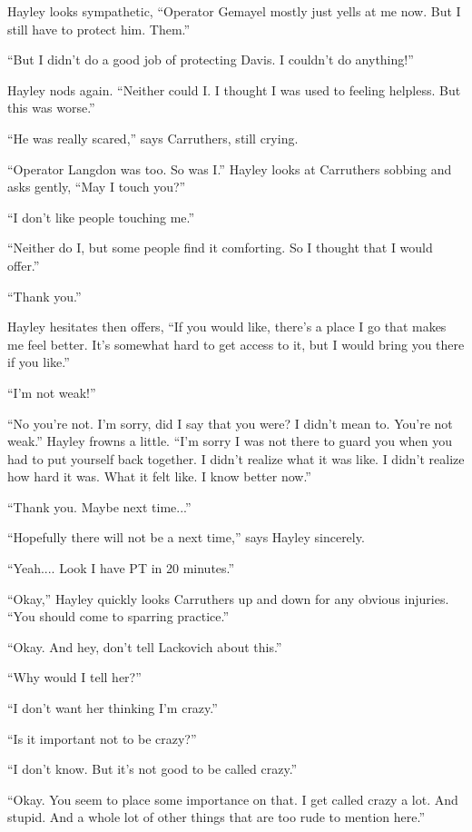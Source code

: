 Hayley looks sympathetic, ``Operator Gemayel mostly just yells at me now.  But I still have to protect him.  Them.''

``But I didn't do a good job of protecting Davis.  I couldn't do anything!''

Hayley nods again.  ``Neither could I.  I thought I was used to feeling helpless.  But this was worse.''

``He was really scared,'' says Carruthers, still crying.

``Operator Langdon was too.  So was I.''  Hayley looks at Carruthers sobbing and asks gently, ``May I touch you?''

``I don't like people touching me.''

``Neither do I, but some people find it comforting.  So I thought that I would offer.''

``Thank you.''

Hayley hesitates then offers, ``If you would like, there's a place I go that makes me feel better.  It's somewhat hard to get access to it, but I would bring you there if you like.''

``I'm not weak!''

``No you're not.  I'm sorry, did I say that you were?  I didn't mean to.  You're not weak.''  Hayley frowns a little.  ``I'm sorry I was not there to guard you when you had to put yourself back together.  I didn't realize what it was like.  I didn't realize how hard it was.  What it felt like.  I know better now.''

``Thank you.  Maybe next time...''

``Hopefully there will not be a next time,'' says Hayley sincerely.

``Yeah.... Look I have PT in 20 minutes.''

``Okay,'' Hayley quickly looks Carruthers up and down for any obvious injuries.  ``You should come to sparring practice.''

``Okay.  And hey, don't tell Lackovich about this.''

``Why would I tell her?''

``I don't want her thinking I'm crazy.''

``Is it important not to be crazy?''

``I don't know.  But it's not good to be called crazy.''

``Okay.  You seem to place some importance on that.  I get called crazy a lot.  And stupid.  And a whole lot of other things that are too rude to mention here.''

